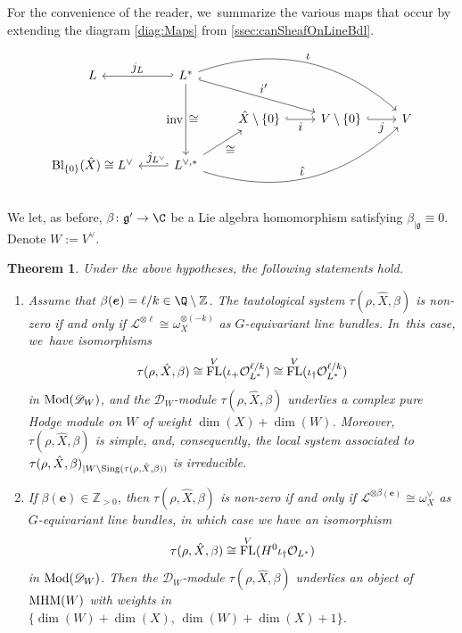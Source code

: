 \documentclass[JEP,XML,SOM,Unicode,published]{cedram}
\let\mathds\mathbb
\let\ts\textstyle
\newcommand{\bme}{{\boldsymbol{e}}}
\newtheorem{thm}{Theorem}[section]
\newcommand{\dZ}{{\mathds Z}}\let\mbz\dZ\let\Z\dZ
\newcommand{\cD}{\mathscr{D}}
\newcommand{\Ell}{\mathscr{L}}
\newcommand{\cO}{\mathcal{O}}\let\O\cO
\newcommand{\frg}{\mathfrak{g}}
\DeclareMathOperator{\FL}{\textup{FL}}
\newcommand{\MHM}{\textup{MHM}}
\newcommand\restr[2]{{#1_{| {#2}}}}
\begin{document}
For the convenience of the reader, we~summarize the various maps that occur by extending the diagram \eqref{diag:Maps} from \cref{ssec:canSheafOnLineBdl}.
\begin{equation}\label{diag:Maps2}
\begin{tikzcd}
L & L^*\ar[swap,hook']{l}{\ts j_L} \ar[swap]{dd}{\ts \textup{inv}}[swap]{\ts \cong} \ar[hook]{rrd}{\ts i'} \ar[bend left]{rrrd}{\ts \iota} & & & \\
&&\hat{X} \setminus \{0\} \ar[hook,swap]{r}{\ts i} & V \setminus \{0\} \ar[hook,swap]{r}{\ts j} & V
\\
\textup{Bl}_{\{0\}}(\hat{X})\cong L^\vee& L^{\vee,*}\ar[hook',swap]{l}{\ts \;\,j_{L^\vee}} \ar[swap]{ur}{\ts \cong}
\ar[bend right]{rrru}{\ts \hat{\iota}}&&&
\end{tikzcd}
\end{equation}

We let, as before,
$\beta \colon \frg' \to \C$ be a Lie algebra homomorphism satisfying $\restr{\beta}{\frg} \equiv 0$. Denote $W := V^\vee$.

\begin{thm}\label{theo:tau_is_MHM}
Under the above hypotheses, the following statements hold.
\begin{enumerate}
\item\label{theo:tau_is_MHM1}
Assume that
$\beta(\bme) = \ell/k \in \Q \setminus \Z$. The tautological system $\tau(\rho,\hat{X},\beta)$ is non-zero if and only if $\Ell^{\otimes \ell} \cong \omega_X^{\otimes (-k)}$ as $G$-equivariant line bundles. In~this case, we~have
isomorphisms
\[
\tau(\rho,\hat X, \beta) \cong \FL^V(\iota_+ \O_{L^*}^{\ell/k}) \cong \FL^V(\iota_\dag \O_{L^*}^{\ell/k})
\]
in $\textup{Mod}(\mathscr{D}_W)$, and the $\mathscr{D}_W$\nobreakdash-mod\-ule $\tau(\rho,\hat X, \beta) $ underlies a complex pure Hodge module on $W$ of weight $\dim(X)+\dim(W)$. Moreover, $\tau(\rho,\hat{X},\beta)$ is simple, and, consequently, the local system associated to
$\tau(\rho,\hat{X},\beta)_{| W \backslash \textup{Sing}(\tau(\rho,\hat{X},\beta))}$ is irreducible.
\item\label{theo:tau_is_MHM2}
If $\beta(\bme)\in \dZ_{>0}$,
then $\tau(\rho,\hat{X},\beta)$ is non-zero if and only if $\Ell^{\otimes \beta(\bme)} \cong \omega_X^\vee$ as $G$-equivariant line bundles, in which case we have an isomorphism
\[
\tau(\rho, \hat{X},\beta) \cong \FL^V(H^0\iota_\dag \cO_{L^*})
\]
in $\textup{Mod}(\cD_W)$. Then the $\mathscr D_W$\nobreakdash-mod\-ule $\tau(\rho, \hat{X},\beta)$ underlies an object of $\MHM(W)$ with weights in $\{\dim(W)+\dim(X),\,\dim(W)+\dim(X)+1\}$.
\end{enumerate}
\end{thm}
\end{document}
